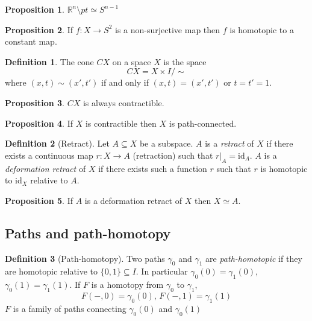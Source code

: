 \documentclass[a4paper,14pt]{extarticle}
\theoremstyle{definition}
\newtheorem*{definition}{Definition}
\newtheorem*{proposition}{Proposition}
\begin{document}
\begin{proposition}
  $\mathbb{R}^n\setminus pt\simeq S^{n-1}$
\end{proposition}

\begin{proposition}
  If $f:X\rightarrow S^2$ is a non-surjective map then $f$ is homotopic to a constant 
  map.
\end{proposition}

\begin{definition}
  The cone $CX$ on a space $X$ is the space
  \[CX=X\times I/\sim\] where $(x,t)\sim(x',t')$ if and only if $(x,t)=(x',t')$ or 
  $t=t'=1$.
\end{definition}

\begin{proposition}
  $CX$ is always contractible.
\end{proposition}

\begin{proposition}
  If $X$ is contractible then $X$ is path-connected.
\end{proposition}

\begin{definition}[Retract]
  Let $A\subseteq X$ be a subspace. $A$ is a \emph{retract} of $X$ if there exists a continuous map $r:X\rightarrow A$ (retraction) such that $r|_A=\text{id}_A$. $A$ is a \emph{deformation
  retract} of $X$ if there exists such a function $r$ such that $r$ is homotopic to 
  $\text{id}_X$ relative to $A$.
\end{definition}

\begin{proposition}
  If $A$ is a deformation retract of $X$ then $X\simeq A$.
\end{proposition}

\subsection{Paths and path-homotopy}

\begin{definition}[Path-homotopy]
  Two paths $\gamma_0$ and $\gamma_1$ are \emph{path-homotopic} if they are homotopic 
  relative to $\{0,1\}\subseteq I$. In particular $\gamma_0(0)=\gamma_1(0)$, 
  $\gamma_0(1)=\gamma_1(1)$. If $F$ is a homotopy from $\gamma_0$ to $\gamma_1$,
  \[F(-,0)=\gamma_0(0), \,F(-,1)=\gamma_1(1)\] $F$ is a family of paths connecting 
  $\gamma_0(0)$ and $\gamma_0(1)$
\end{definition}
\end{document}

